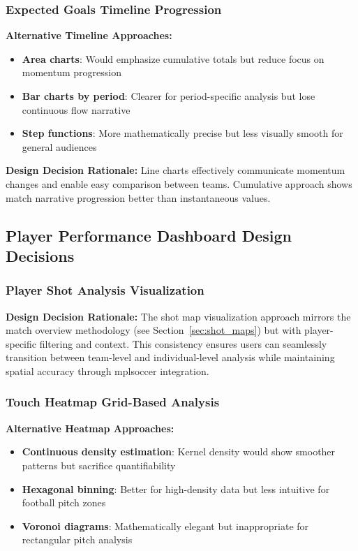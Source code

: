 \documentclass[12pt,a4paper]{article}
\begin{document}
\subsubsection{Expected Goals Timeline Progression}
\textbf{Alternative Timeline Approaches:}
\begin{itemize}
    \item \textbf{Area charts}: Would emphasize cumulative totals but reduce focus on momentum progression
    \item \textbf{Bar charts by period}: Clearer for period-specific analysis but lose continuous flow narrative
    \item \textbf{Step functions}: More mathematically precise but less visually smooth for general audiences
\end{itemize}

\textbf{Design Decision Rationale:}
Line charts effectively communicate momentum changes and enable easy comparison between teams. Cumulative approach shows match narrative progression better than instantaneous values.

\subsection{Player Performance Dashboard Design Decisions}

\subsubsection{Player Shot Analysis Visualization}
\textbf{Design Decision Rationale:}
The shot map visualization approach mirrors the match overview methodology (see Section~\ref{sec:shot_maps}) but with player-specific filtering and context. This consistency ensures users can seamlessly transition between team-level and individual-level analysis while maintaining spatial accuracy through mplsoccer integration.

\subsubsection{Touch Heatmap Grid-Based Analysis}
\textbf{Alternative Heatmap Approaches:}
\begin{itemize}
    \item \textbf{Continuous density estimation}: Kernel density would show smoother patterns but sacrifice quantifiability
    \item \textbf{Hexagonal binning}: Better for high-density data but less intuitive for football pitch zones
    \item \textbf{Voronoi diagrams}: Mathematically elegant but inappropriate for rectangular pitch analysis
\end{itemize}
\end{document}

